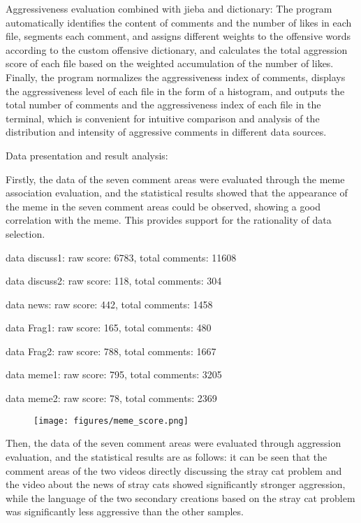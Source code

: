 \documentclass[12pt,a4paper]{ctexart}
\begin{document}
Aggressiveness evaluation combined with jieba and dictionary: The program automatically identifies the content of comments and the number of likes in each file, segments each comment, and assigns different weights to the offensive words according to the custom offensive dictionary, and calculates the total aggression score of each file based on the weighted accumulation of the number of likes. Finally, the program normalizes the aggressiveness index of comments, displays the aggressiveness level of each file in the form of a histogram, and outputs the total number of comments and the aggressiveness index of each file in the terminal, which is convenient for intuitive comparison and analysis of the distribution and intensity of aggressive comments in different data sources.

Data presentation and result analysis:

Firstly, the data of the seven comment areas were evaluated through the meme association evaluation, and the statistical results showed that the appearance of the meme in the seven comment areas could be observed, showing a good correlation with the meme. This provides support for the rationality of data selection.

data discuss1: raw score: 6783, total comments: 11608

data discuss2: raw score: 118, total comments: 304

data news: raw score: 442, total comments: 1458

data Frag1: raw score: 165, total comments: 480

data Frag2: raw score: 788, total comments: 1667

data meme1: raw score: 795, total comments: 3205

data meme2: raw score: 78, total comments: 2369

\begin{figure}[htbp]
    \centering
    \texttt{[image: figures/meme\_score.png]}
\end{figure}

Then, the data of the seven comment areas were evaluated through aggression evaluation, and the statistical results are as follows: it can be seen that the comment areas of the two videos directly discussing the stray cat problem and the video about the news of stray cats showed significantly stronger aggression, while the language of the two secondary creations based on the stray cat problem was significantly less aggressive than the other samples.
\end{document}
